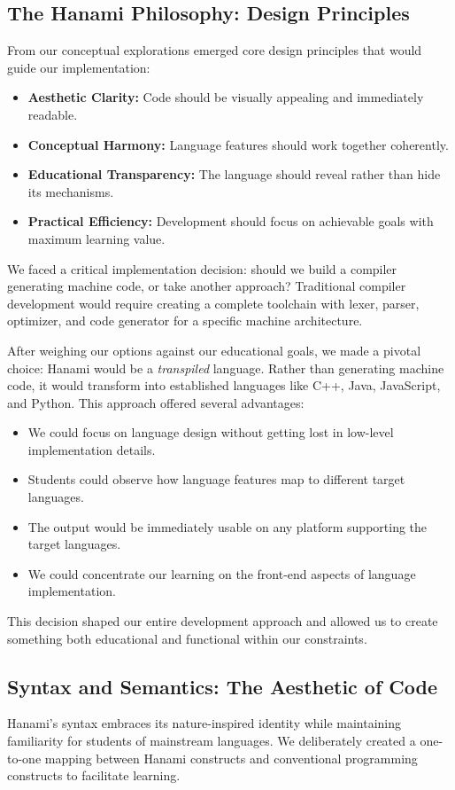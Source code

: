 \documentclass[conference]{IEEEtran}
\begin{document}
\subsection{The Hanami Philosophy: Design Principles}
From our conceptual explorations emerged core design principles that would guide our implementation:
\begin{itemize}
    \item \textbf{Aesthetic Clarity:} Code should be visually appealing and immediately readable.
    \item \textbf{Conceptual Harmony:} Language features should work together coherently.
    \item \textbf{Educational Transparency:} The language should reveal rather than hide its mechanisms.
    \item \textbf{Practical Efficiency:} Development should focus on achievable goals with maximum learning value.
\end{itemize}
We faced a critical implementation decision: should we build a compiler generating machine code, or take another approach? Traditional compiler development would require creating a complete toolchain with lexer, parser, optimizer, and code generator for a specific machine architecture.

After weighing our options against our educational goals, we made a pivotal choice: Hanami would be a \textit{transpiled} language. Rather than generating machine code, it would transform into established languages like C++, Java, JavaScript, and Python. This approach offered several advantages:
\begin{itemize}
    \item We could focus on language design without getting lost in low-level implementation details.
    \item Students could observe how language features map to different target languages.
    \item The output would be immediately usable on any platform supporting the target languages.
    \item We could concentrate our learning on the front-end aspects of language implementation.
\end{itemize}
This decision shaped our entire development approach and allowed us to create something both educational and functional within our constraints.

\subsection{Syntax and Semantics: The Aesthetic of Code}
Hanami's syntax embraces its nature-inspired identity while maintaining familiarity for students of mainstream languages. We deliberately created a one-to-one mapping between Hanami constructs and conventional programming constructs to facilitate learning.
\end{document}
